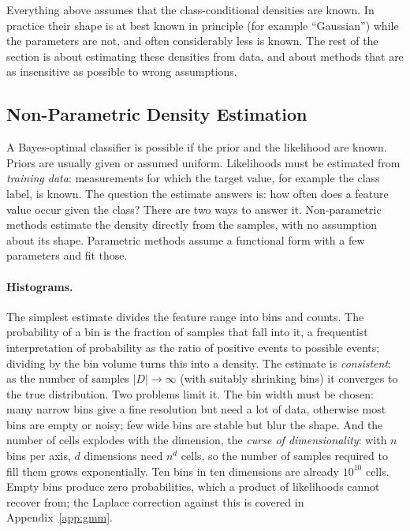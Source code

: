 \noindent
Everything above assumes that the class-conditional densities are known. In
practice their shape is at best known in principle (for example ``Gaussian'')
while the parameters are not, and often considerably less is known. The rest of
the section is about estimating these densities from data, and about methods
that are as insensitive as possible to wrong assumptions.

\subsection{Non-Parametric Density Estimation}

A Bayes-optimal classifier is possible if the prior and the likelihood are
known. Priors are usually given or assumed uniform. Likelihoods must be
estimated from \emph{training data}: measurements for which the target value, for
example the class label, is known. The question the estimate answers is: how
often does a feature value occur given the class? There are two ways to answer
it. Non-parametric methods estimate the density directly from the samples, with
no assumption about its shape. Parametric methods assume a functional form with
a few parameters and fit those.

\paragraph{Histograms.}
The simplest estimate divides the feature range into bins and counts. The
probability of a bin is the fraction of samples that fall into it, a
frequentist interpretation of probability as the ratio of positive events to
possible events; dividing by the bin volume turns this into a density. The
estimate is \emph{consistent}: as the number of samples $\lvert D\rvert\to\infty$
(with suitably shrinking bins) it converges to the true distribution. Two
problems limit it. The bin width must be chosen: many narrow bins give a fine
resolution but need a lot of data, otherwise most bins are empty or noisy; few
wide bins are stable but blur the shape. And the number of cells explodes with
the dimension, the \emph{curse of dimensionality}: with $n$ bins per axis, $d$
dimensions need $n^d$ cells, so the number of samples required to fill them
grows exponentially. Ten bins in ten dimensions are already $10^{10}$ cells.
Empty bins produce zero probabilities, which a product of likelihoods cannot
recover from; the Laplace correction against this is covered in
Appendix~\ref{app:gmm}.

